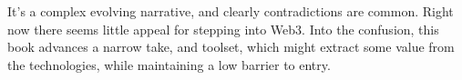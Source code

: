 It's a complex evolving narrative, and clearly contradictions are common. Right now there seems little appeal for stepping into Web3. Into the confusion, this book advances a narrow take, and toolset, which might extract some value from the technologies, while maintaining a low barrier to entry.\par 
\begin{comment}
\section{Example applications}
It's handy here to get a feel for what this looks like. These aren't things that this book wishes to contribute to, or even have a firm opinion on, they're just representative of current activity in the decentralised web space.
\subsection{Podcasting2.0}
\href{https://medium.com/@everywheretrip/an-introduction-to-podcasting-2-0-3c4f61ea17f4}{Podcasting 2.0} leverages \href{https://www.rssboard.org/rss-specification}{RSS} (the original dissemination system for podcasts) and the Bitcoin Lightning network, to enable so-called `\href{https://www.youtube.com/watch?v=NO1aDZ6L4NQ&t=1123s}{value for value}' broadcasting. Subscribers use one of a variety of apps to stream micro-transactions of Bitcoin directly to the content creators as they listen to the podcast. No intermediate business takes a cut. Some variation on this model exists, such as John Carvalho's crowd funded podcast ``The Biz'' which progressively unlocks more minutes for everyone based on \href{https://thebiz.pro/about#crowdwall}{crowd funded donations}.
\subsection{Crowd funding}
At time of writing a \href{https://www.constitutiondao.com/}{crowd funding initiative} based around a digital decentralised construct called a DAO (explained later in detail) \href{https://www.coindesk.com/business/2021/12/06/daos-and-the-next-crowdfunding-gold-rush/}{managed to raise \$46 million dollars to bid for a copy of the US constitution} at Southerbys auction house. The attempt narrowly failed, but the press \href{https://www.coindesk.com/business/2021/12/09/what-kickstarter-going-decentralized-means-for-web-3/}{heralded this new era of ``Web3'' economic might}. This model might be the only use for DAOs and is likely just a way to avoid regulatory scrutiny. There is more detail on DAOs later.

\end{comment}
